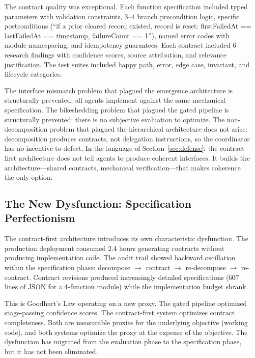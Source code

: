 \documentclass[11pt,a4paper]{article}
\begin{document}
The contract quality was exceptional. Each function specification included typed parameters with validation constraints, 3--4 branch precondition logic, specific postconditions (``if a prior cleared record existed, record is reset: firstFailedAt == lastFailedAt == timestamp, failureCount == 1''), named error codes with module namespacing, and idempotency guarantees. Each contract included 6 research findings with confidence scores, source attribution, and relevance justification. The test suites included happy path, error, edge case, invariant, and lifecycle categories.

The interface mismatch problem that plagued the emergence architecture is structurally prevented: all agents implement against the same mechanical specification. The bikeshedding problem that plagued the gated pipeline is structurally prevented: there is no subjective evaluation to optimize. The non-decomposition problem that plagued the hierarchical architecture does not arise: decomposition produces contracts, not delegation instructions, so the coordinator has no incentive to defect. In the language of Section~\ref{sec:defense}: the contract-first architecture does not tell agents to produce coherent interfaces. It builds the architecture---shared contracts, mechanical verification---that makes coherence the only option.

\subsection{The New Dysfunction: Specification Perfectionism}

The contract-first architecture introduces its own characteristic dysfunction. The production deployment consumed 2.4 hours generating contracts without producing implementation code. The audit trail showed backward oscillation within the specification phase: decompose $\to$ contract $\to$ re-decompose $\to$ re-contract. Contract revisions produced increasingly detailed specifications (607 lines of JSON for a 4-function module) while the implementation budget shrank.

This is Goodhart's Law operating on a new proxy. The gated pipeline optimized stage-passing confidence scores. The contract-first system optimizes contract completeness. Both are measurable proxies for the underlying objective (working code), and both systems optimize the proxy at the expense of the objective. The dysfunction has migrated from the evaluation phase to the specification phase, but it has not been eliminated.
\end{document}

